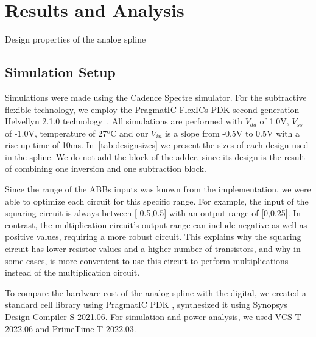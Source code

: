 \section{Results and Analysis}\label{sec:Results}

\begin{table}
\centering
\caption{Design properties of the analog spline}

\label{tab:designsizes}
\end{table}

\subsection{Simulation Setup}

Simulations were made using the Cadence Spectre simulator. For the subtractive flexible technology, we employ the PragmatIC FlexICs PDK second-generation Helvellyn 2.1.0 technology~\cite{FlexICs}. All simulations are performed with $V_{dd}$ of 1.0V, $V_{ss}$ of -1.0V, temperature of 27ºC and our $V_{in}$ is a slope from -0.5V to 0.5V with a rise up time of 10ms.
In~\autoref{tab:designsizes} we present the sizes of each design used in the spline. We do not add the block of the adder, since its design is the result of combining one inversion and one subtraction block.

Since the range of the ABBs inputs was known from the implementation, we were able to optimize each circuit for this specific range. 
For example, the input of the squaring circuit is always between [-0.5,0.5] with an output range of [0,0.25]. 
In contrast, the multiplication circuit's output range can include negative as well as positive values, requiring a more robust circuit. This explains why the squaring circuit has lower resistor values and a higher number of transistors, and why in some cases, is more convenient to use this circuit to perform multiplications instead of the multiplication circuit.

To compare the hardware cost of the analog spline with the digital, we created a standard cell library using PragmatIC PDK , synthesized it using Synopsys Design Compiler S-2021.06. 
For simulation and power analysis, we used VCS T-2022.06 and PrimeTime T-2022.03. 

